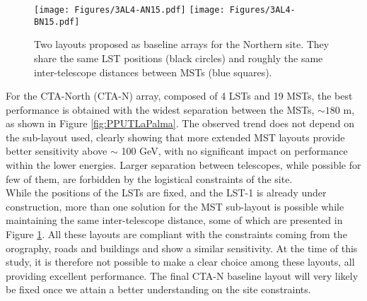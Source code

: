 \documentclass{PoS}
\begin{document}
\begin{figure}
\begin{center}
\texttt{[image: Figures/3AL4-AN15.pdf]}
\texttt{[image: Figures/3AL4-BN15.pdf]}\\
\caption{Two layouts proposed as baseline arrays for the Northern site. They share the same LST positions (black circles) and roughly the same inter-telescope distances between MSTs (blue squares).}
\label{fig:AL4}
\end{center}
\end{figure}
For the CTA-North (CTA-N) array, composed of 4 LSTs and 19 MSTs, the best performance is obtained with the widest separation between the MSTs, $\sim 180$ m, as shown in Figure \ref{fig:PPUTLaPalma}. The observed trend does not depend on the sub-layout used, clearly showing that more extended MST layouts provide better sensitivity above $\sim$ 100 GeV, with no significant impact on performance within the lower energies. Larger separation between telescopes, while possible for few of them, are forbidden by the logistical constraints of the site.\\
While the positions of the LSTs are fixed, and the LST-1 is already under construction, more than one solution for the MST sub-layout is possible while maintaining the same inter-telescope distance, some of which are presented in Figure \ref{fig:AL4}. All these layouts are compliant with the constraints coming from the orography, roads and buildings and show a similar sensitivity. At the time of this study, it is therefore not possible to make a clear choice among these layouts, all providing excellent performance. The final CTA-N baseline layout will very likely be fixed once we attain a better understanding on the site constraints. 
\end{document}

